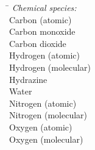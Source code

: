 \begin{tabbing}\hspace*{\lensymb}\=\hspace*{\lenWHAT}\kill
    {\em Chemical species:} \\                                                                       
                                    \> Carbon (atomic)                                                                                                                          \\
                                   \> Carbon monoxide                                                                                                                          \\
                                  \> Carbon dioxide                                                                                                                           \\
                                    \> Hydrogen (atomic)                                                                                                                        \\
                                   \> Hydrogen (molecular)                                                                                                                     \\
                                 \> Hydrazine                                                                                                                                \\
                                  \> Water                                                                                                                                    \\
                                    \> Nitrogen (atomic)                                                                                                                        \\
                                   \> Nitrogen (molecular)                                                                                                                     \\
                                    \> Oxygen (atomic)                                                                                                                          \\
                                   \> Oxygen (molecular)                                                                                                                       \\
\end{tabbing}



